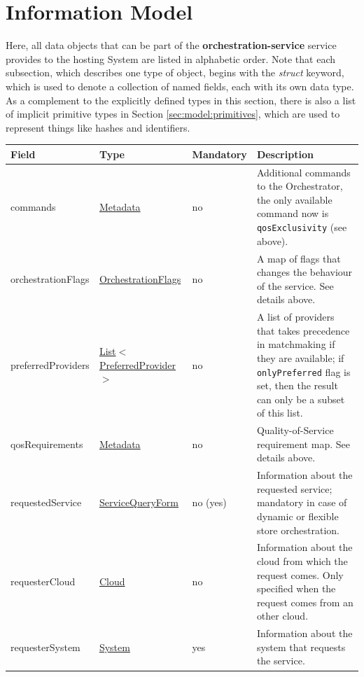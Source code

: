 \documentclass[a4paper]{arrowhead}
\newcommand{\pref}[1]{{\textcolor{ArrowheadGrey}{\hyperref[sec:model:primitives:#1]{#1}}}}
\begin{document}
\clearpage

\section{Information Model}
\label{sec:model}

Here, all data objects that can be part of the \textbf{orchestration-service} service
provides to the hosting System are listed in alphabetic order.
Note that each subsection, which describes one type of object, begins with the \textit{struct} keyword, which is used to denote a collection of named fields, each with its own data type.
As a complement to the explicitly defined types in this section, there is also a list of implicit primitive types in Section \ref{sec:model:primitives}, which are used to represent things like hashes and identifiers.

\label{sec:model:OrchestrationForm}

\begin{table}[ht!]
\begin{tabularx}{\textwidth}{| p{4cm} | p{4cm} | p{2cm} | X |} \hline
\rowcolor{gray!33} Field & Type & Mandatory & Description \\ \hline
commands &\hyperref[sec:model:Metadata]{Metadata} & no & Additional commands to the Orchestrator, the only available command now is \texttt{qosExclusivity} (see above). \\ \hline
orchestrationFlags &\hyperref[sec:model:OrchestrationFlags]{OrchestrationFlags} & no & A map of flags that changes the behaviour of the service. See details above. \\ \hline
preferredProviders &\pref{List}$<$\hyperref[sec:model:PreferredProvider]{PreferredProvider}$>$ & no & A list of providers that takes precedence in matchmaking if they are available; if \texttt{onlyPreferred} flag is set, then the result can only be a subset of this list. \\ \hline
qosRequirements &\hyperref[sec:model:Metadata]{Metadata} & no & Quality-of-Service requirement map. See details above. \\ \hline
requestedService &\hyperref[sec:model:SQF]{ServiceQueryForm} & no (yes) & Information about the requested service; mandatory in case of dynamic or flexible store orchestration. \\ \hline
requesterCloud &\hyperref[sec:model:Cloud]{Cloud} & no & Information about the cloud from which the request comes. Only specified when the request comes from an other cloud. \\ \hline
requesterSystem &\hyperref[sec:model:System]{System} & yes & Information about the system that requests the service. \\ \hline
\end{tabularx}
\end{table}
\end{document}
